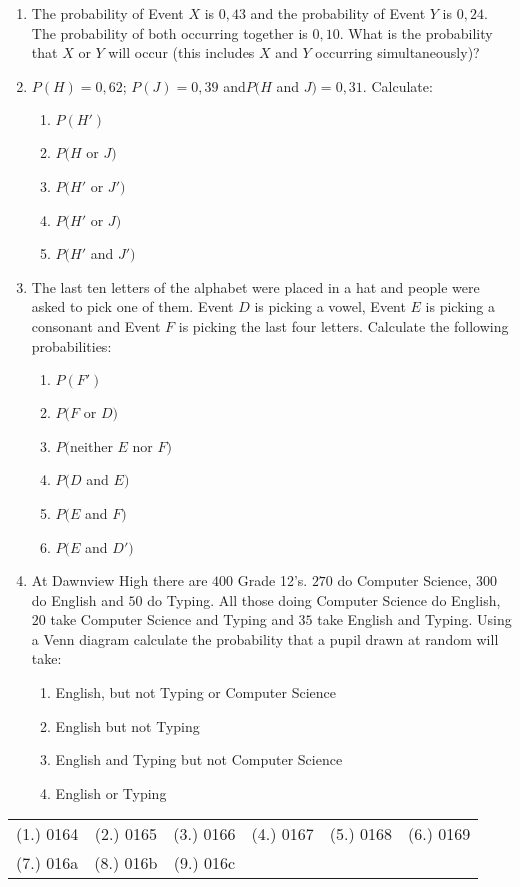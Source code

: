 \begin{eocexercises}{}
\begin{enumerate}
\item The probability of Event $X$ is $0,43$ and the probability of Event $Y$ is $0,24$. The probability of both occurring together is $0,10$. What is the probability that $X$ or $Y$ will occur (this includes $X$ and $Y$ occurring simultaneously)?  
\item$ P(H)=0,62$; $P(J)=0,39$ and$ P(H$ and $J)=0,31$. Calculate:
	\begin{enumerate}
	\item $P(H')$ 
	\item $P(H$ or $J)$
	\item $P(H'$ or $J')$
	\item $P(H'$ or $J)$
	\item $P(H'$ and $J')$
	\end{enumerate}
\item The last ten letters of the alphabet were placed in a hat and people were asked to pick one of them. Event $D$ is picking a vowel, Event $E$ is picking a consonant and Event $F$ is picking the last four letters. Calculate the following probabilities:
	\begin{enumerate}
	\item $P(F')$ 
	\item $P(F$ or $D)$
	\item $P($neither $E$ nor $F)$
	\item $P(D$ and $E)$
	\item $P(E$ and $F)$
	\item $P(E$ and $D')$
	\end{enumerate}
\item At Dawnview High there are $400$ Grade 12's. $270$ do Computer Science, $300$ do English and $50$ do Typing. All those doing Computer Science do English, $20$ take Computer Science and Typing and $35$ take English and Typing. Using a Venn diagram calculate the probability that a pupil drawn at random will take:
	\begin{enumerate}
	\item English, but not Typing or Computer Science 
	\item English but not Typing
	\item English and Typing but not Computer Science
	\item English or Typing
	\end{enumerate}   
\end{enumerate}


\par \practiceinfo
\par \begin{tabular}[h]{cccccc}
(1.)	0164	&
(2.)	0165	&
(3.)	0166	&
(4.)	0167	&
(5.)	0168	&
(6.)	0169	\\ %
(7.)	016a	&
(8.)	016b	&
(9.)	016c	&
\end{tabular}
\end{eocexercises} 








\appendix
